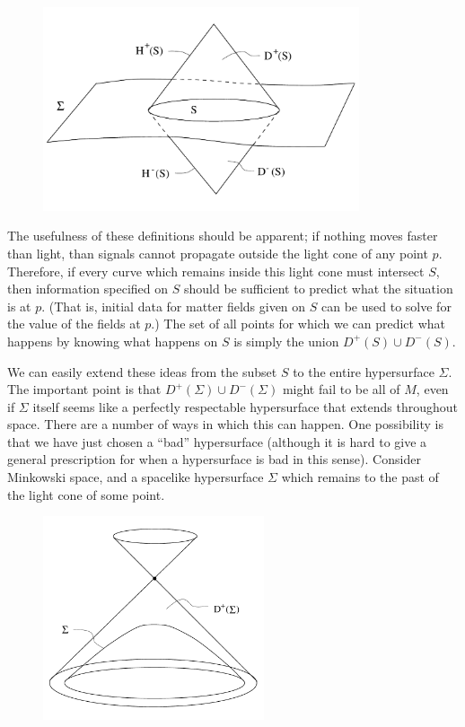 \documentclass[12pt]{article}
\begin{document}
\begin{figure}[h]
  \centerline{
  \includegraphics[height=6cm]{pdf/four11}}
\end{figure}

The usefulness of these definitions should be apparent; if nothing
moves faster than light, than signals cannot propagate outside the
light cone of any point $p$.  Therefore, if every curve which
remains inside this light cone must intersect $S$, then information
specified on $S$ should be sufficient to predict what the situation
is at $p$.  (That is, initial data for matter fields given on $S$
can be used to solve for the value of the fields at $p$.)  The set
of all points for which we can predict what happens by knowing 
what happens on $S$ is simply the union $D^+(S)\cup D^-(S)$.

We can easily extend these ideas from the subset $S$ to the entire
hypersurface $\Sigma$.  The important point is that $D^+(\Sigma)\cup 
D^-(\Sigma)$ might fail to be all of $M$, even if $\Sigma$ itself
seems like a perfectly respectable hypersurface that extends 
throughout space.  There are a number of ways in which this can
happen.  One possibility is that we have just chosen a ``bad''
hypersurface (although it is hard to give a general prescription for
when a hypersurface is bad in this sense).  Consider Minkowski space,
and a spacelike hypersurface $\Sigma$ which remains to the past of
the light cone of some point.

\begin{figure}[h]
  \centerline{
  \includegraphics[height=6cm]{pdf/four12}}
\end{figure}
\end{document}
